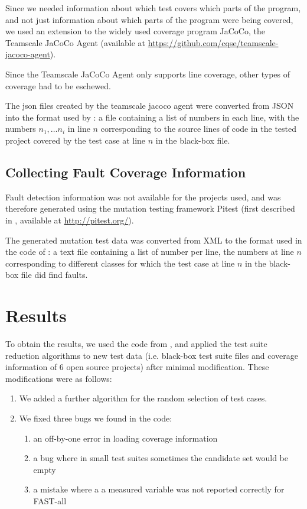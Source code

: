 Since we needed information about which test covers which parts
of the program, and not just information about which parts of the
program were being covered, we used an extension to the widely used
coverage program JaCoCo, the Teamscale JaCoCo Agent (available at
\url{https://github.com/cqse/teamscale-jacoco-agent}).

Since the Teamscale JaCoCo Agent only supports line coverage, other
types of coverage had to be eschewed.

The json files created by the teamscale jacoco agent were converted
from JSON into the format used by \cite{cruciani2019scalable}: a file
containing a list of numbers in each line, with the numbers $n_1, \dots
n_i$ in line $n$ corresponding to the source lines of code in the tested
project covered by the test case at line $n$ in the black-box file.

\subsection{Collecting Fault Coverage Information}

Fault detection information was not available for the projects used, and
was therefore generated using the mutation testing framework Pitest (first
described in \cite{coles2016pit}, available at \url{http://pitest.org/}).

The generated mutation test data was converted from XML to the format
used in the code of \cite{cruciani2019scalable}: a text file containing
a list of number per line, the numbers at line $n$ corresponding to
different classes for which the test case at line $n$ in the black-box
file did find faults.

\section{Results}

To obtain the results, we used the code from \cite{cruciani2019scalable},
and applied the test suite reduction algorithms to new test data
(i.e. black-box test suite files and coverage information of 6 open source
projects) after minimal modification. These modifications were as follows:

\begin{enumerate}
\item We added a further algorithm for the random selection of test cases.
\item We fixed three bugs we found in the code:
	\begin{enumerate}
	\item an off-by-one error in loading coverage information
	\item a bug where in small test suites sometimes the candidate set would be empty
	\item a mistake where a a measured variable was not reported correctly for FAST-all
	\end{enumerate}
\end{enumerate}

